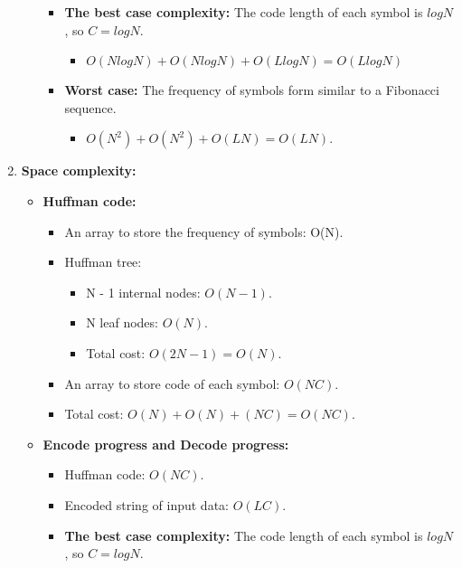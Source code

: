 \begin{enumerate}[label=\textbf{\Alph*.}]
\begin{itemize}
\begin{itemize}
\begin{itemize}
                \end{itemize}
                \item \textbf{The best case complexity:} The code length of each symbol is $logN$, so $C = logN$.
                \begin{itemize}
                    \item $O(NlogN) + O(NlogN) + O(LlogN) = O(LlogN)$
                \end{itemize}
                \item \textbf{Worst case:} The frequency of symbols form similar to a Fibonacci sequence.
                \begin{itemize}
                    \item $O(N^2) + O(N^2) + O(LN) = O(LN)$.
                \end{itemize}
            \end{itemize}
        \end{itemize}
        \item \textbf{Space complexity:}
        \begin{itemize}
            \item \textbf{Huffman code:}
            \begin{itemize}
                \item An array to store the frequency of symbols: O(N).
                \item Huffman tree:
                \begin{itemize}
                    \item N - 1 internal nodes: $O(N - 1)$.
                    \item N leaf nodes: $O(N)$.
                    \item Total cost: $O(2N - 1) = O(N)$.
                \end{itemize}
                \item An array to store code of each symbol: $O(NC)$.
                \item Total cost: $O(N) + O(N) + (NC) = O(NC)$.
            \end{itemize}
            \item \textbf{Encode progress and Decode progress:}
            \begin{itemize}
                \item Huffman code: $O(NC)$.
                \item Encoded string of input data: $O(LC)$.
                \item \textbf{The best case complexity:} The code length of each symbol is $logN$, so $C = logN$.

\end{itemize}
\end{itemize}
\end{enumerate}
